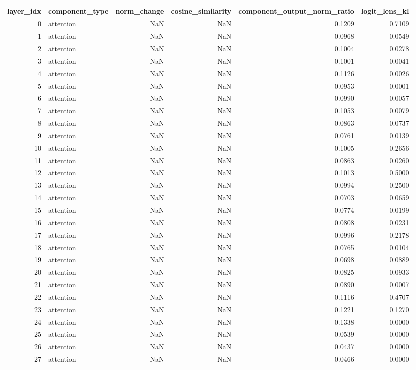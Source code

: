 \begin{tabular}{rlrrrr}
\toprule
layer_idx & component_type & norm_change & cosine_similarity & component_output_norm_ratio & logit_lens_kl \\
\midrule
0 & attention & NaN & NaN & 0.1209 & 0.7109 \\
1 & attention & NaN & NaN & 0.0968 & 0.0549 \\
2 & attention & NaN & NaN & 0.1004 & 0.0278 \\
3 & attention & NaN & NaN & 0.1001 & 0.0041 \\
4 & attention & NaN & NaN & 0.1126 & 0.0026 \\
5 & attention & NaN & NaN & 0.0953 & 0.0001 \\
6 & attention & NaN & NaN & 0.0990 & 0.0057 \\
7 & attention & NaN & NaN & 0.1053 & 0.0079 \\
8 & attention & NaN & NaN & 0.0863 & 0.0737 \\
9 & attention & NaN & NaN & 0.0761 & 0.0139 \\
10 & attention & NaN & NaN & 0.1005 & 0.2656 \\
11 & attention & NaN & NaN & 0.0863 & 0.0260 \\
12 & attention & NaN & NaN & 0.1013 & 0.5000 \\
13 & attention & NaN & NaN & 0.0994 & 0.2500 \\
14 & attention & NaN & NaN & 0.0703 & 0.0659 \\
15 & attention & NaN & NaN & 0.0774 & 0.0199 \\
16 & attention & NaN & NaN & 0.0808 & 0.0231 \\
17 & attention & NaN & NaN & 0.0996 & 0.2178 \\
18 & attention & NaN & NaN & 0.0765 & 0.0104 \\
19 & attention & NaN & NaN & 0.0698 & 0.0889 \\
20 & attention & NaN & NaN & 0.0825 & 0.0933 \\
21 & attention & NaN & NaN & 0.0890 & 0.0007 \\
22 & attention & NaN & NaN & 0.1116 & 0.4707 \\
23 & attention & NaN & NaN & 0.1221 & 0.1270 \\
24 & attention & NaN & NaN & 0.1338 & 0.0000 \\
25 & attention & NaN & NaN & 0.0539 & 0.0000 \\
26 & attention & NaN & NaN & 0.0437 & 0.0000 \\
27 & attention & NaN & NaN & 0.0466 & 0.0000 \\

\end{tabular}
